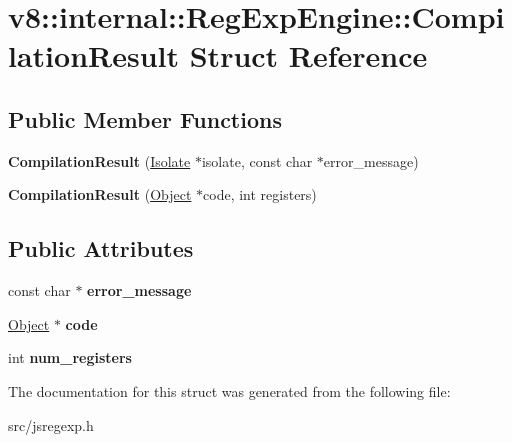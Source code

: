 \hypertarget{structv8_1_1internal_1_1_reg_exp_engine_1_1_compilation_result}{}\section{v8\+:\+:internal\+:\+:Reg\+Exp\+Engine\+:\+:Compilation\+Result Struct Reference}
\label{structv8_1_1internal_1_1_reg_exp_engine_1_1_compilation_result}
\subsection*{Public Member Functions}
\begin{DoxyCompactItemize}
\item 
\hypertarget{structv8_1_1internal_1_1_reg_exp_engine_1_1_compilation_result_ae09fb0e61981b463c8e0bd3dc7e0d7a0}{}{\bfseries Compilation\+Result} (\hyperlink{classv8_1_1internal_1_1_isolate}{Isolate} $\ast$isolate, const char $\ast$error\+\_\+message)\label{structv8_1_1internal_1_1_reg_exp_engine_1_1_compilation_result_ae09fb0e61981b463c8e0bd3dc7e0d7a0}

\item 
\hypertarget{structv8_1_1internal_1_1_reg_exp_engine_1_1_compilation_result_add8747981b5647a04f2fec660508c893}{}{\bfseries Compilation\+Result} (\hyperlink{classv8_1_1internal_1_1_object}{Object} $\ast$code, int registers)\label{structv8_1_1internal_1_1_reg_exp_engine_1_1_compilation_result_add8747981b5647a04f2fec660508c893}

\end{DoxyCompactItemize}
\subsection*{Public Attributes}
\begin{DoxyCompactItemize}
\item 
\hypertarget{structv8_1_1internal_1_1_reg_exp_engine_1_1_compilation_result_ad87d97fff0bf6049606dbd0e85e58648}{}const char $\ast$ {\bfseries error\+\_\+message}\label{structv8_1_1internal_1_1_reg_exp_engine_1_1_compilation_result_ad87d97fff0bf6049606dbd0e85e58648}

\item 
\hypertarget{structv8_1_1internal_1_1_reg_exp_engine_1_1_compilation_result_a13957b8f71d31e21b4ff5f5add20f283}{}\hyperlink{classv8_1_1internal_1_1_object}{Object} $\ast$ {\bfseries code}\label{structv8_1_1internal_1_1_reg_exp_engine_1_1_compilation_result_a13957b8f71d31e21b4ff5f5add20f283}

\item 
\hypertarget{structv8_1_1internal_1_1_reg_exp_engine_1_1_compilation_result_ae0cb9918f7a58118e48f3709483f6a29}{}int {\bfseries num\+\_\+registers}\label{structv8_1_1internal_1_1_reg_exp_engine_1_1_compilation_result_ae0cb9918f7a58118e48f3709483f6a29}

\end{DoxyCompactItemize}


The documentation for this struct was generated from the following file\+:\begin{DoxyCompactItemize}
\item 
src/jsregexp.\+h\end{DoxyCompactItemize}
